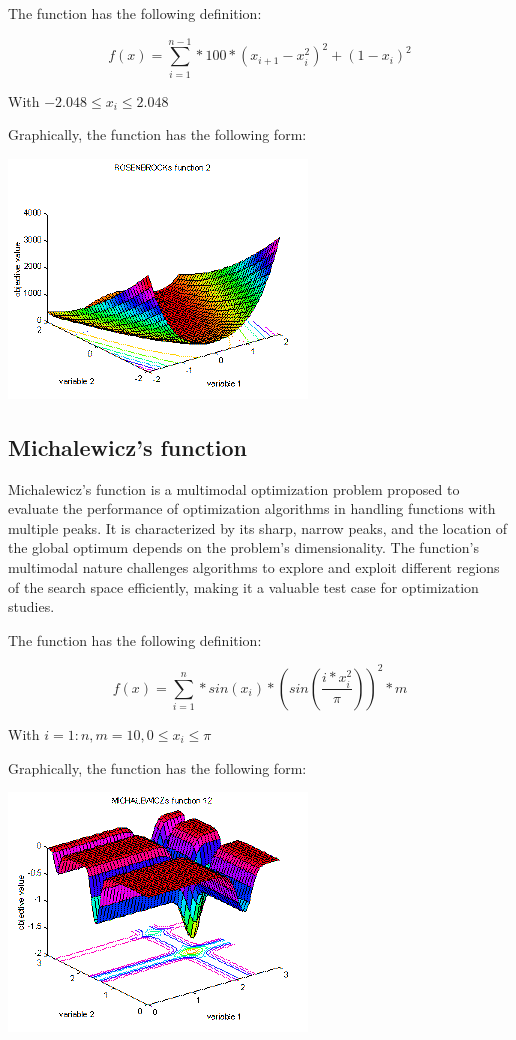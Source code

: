 \documentclass[conference]{IEEEtran}
\begin{document}
The function has the following definition:

\begin{equation}
    f(x) = \sum_{i=1}^{n-1} * 100 * (x_{i+1} - x_i^2)^2 + (1 - x_i)^2
\end{equation}

With $-2.048 \leq x_i \leq 2.048$

Graphically, the function has the following form:

\includegraphics[scale=0.75]{../images/fcnindex-msh_f2_2-11.gif}

\subsection{Michalewicz's function}
Michalewicz's function is a multimodal optimization problem proposed to evaluate the performance of optimization algorithms
in handling functions with multiple peaks. It is characterized by its sharp, narrow peaks, and the location of the global optimum
depends on the problem's dimensionality. The function's multimodal nature challenges algorithms to explore and exploit different regions
of the search space efficiently, making it a valuable test case for optimization studies.

The function has the following definition:

\begin{equation}
    f(x) = \sum_{i=1}^{n} * sin(x_i) * (sin(\frac{i * x_i^2}{\pi}))^2*m
\end{equation}

With $i = 1:n, m = 10, 0 \leq x_i \leq \pi$

Graphically, the function has the following form:

\includegraphics[scale=0.75]{../images/fcnindex-msh_f12_0_3-31.gif}
\end{document}
